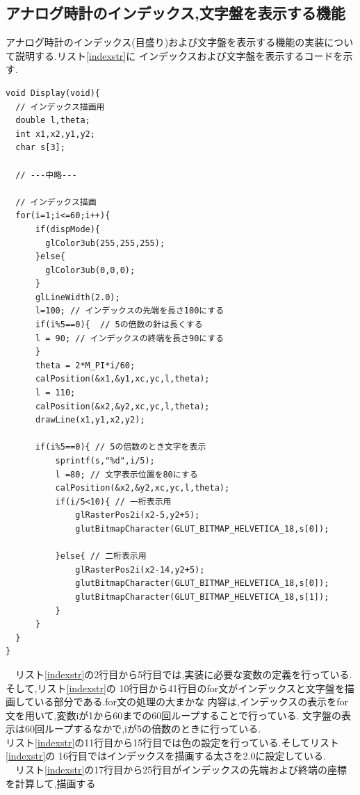 \documentclass[a4j]{jarticle}
\begin{document}
    \subsection{アナログ時計のインデックス,文字盤を表示する機能}
    アナログ時計のインデックス(目盛り)および文字盤を表示する機能の実装について説明する.リスト\ref{indexstr}に
    インデックスおよび文字盤を表示するコードを示す.\\
    \begin{lstlisting}[basicstyle=\ttfamily\footnotesize, frame=single,label=indexstr,caption=インデックスと文字盤の実装]
void Display(void){
  // インデックス描画用
  double l,theta; 
  int x1,x2,y1,y2;
  char s[3];

  // ---中略---

  // インデックス描画
  for(i=1;i<=60;i++){
      if(dispMode){
        glColor3ub(255,255,255);
      }else{
        glColor3ub(0,0,0);
      }
      glLineWidth(2.0);
      l=100; // インデックスの先端を長さ100にする
      if(i%5==0){  // 5の倍数の針は長くする
      l = 90; // インデックスの終端を長さ90にする
      }
      theta = 2*M_PI*i/60;
      calPosition(&x1,&y1,xc,yc,l,theta);
      l = 110;
      calPosition(&x2,&y2,xc,yc,l,theta);
      drawLine(x1,y1,x2,y2);

      if(i%5==0){ // 5の倍数のとき文字を表示
          sprintf(s,"%d",i/5);
          l =80; // 文字表示位置を80にする
          calPosition(&x2,&y2,xc,yc,l,theta);
          if(i/5<10){ // 一桁表示用
              glRasterPos2i(x2-5,y2+5);
              glutBitmapCharacter(GLUT_BITMAP_HELVETICA_18,s[0]);

          }else{ // 二桁表示用
              glRasterPos2i(x2-14,y2+5);
              glutBitmapCharacter(GLUT_BITMAP_HELVETICA_18,s[0]);
              glutBitmapCharacter(GLUT_BITMAP_HELVETICA_18,s[1]);
          }
      }
  }
}
    \end{lstlisting}
    　リスト\ref{indexstr}の2行目から5行目では,実装に必要な変数の定義を行っている.そして,リスト\ref{indexstr}の
    10行目から41行目のfor文がインデックスと文字盤を描画している部分である.for文の処理の大まかな
    内容は,インデックスの表示をfor文を用いて,変数iが1から60までの60回ループすることで行っている.
    文字盤の表示は60回ループするなかで,iが5の倍数のときに行っている.\\
    リスト\ref{indexstr}の11行目から15行目では色の設定を行っている.そしてリスト\ref{indexstr}の
    16行目ではインデックスを描画する太さを2.0に設定している.\\
    　リスト\ref{indexstr}の17行目から25行目がインデックスの先端および終端の座標を計算して,描画する
\end{document}
